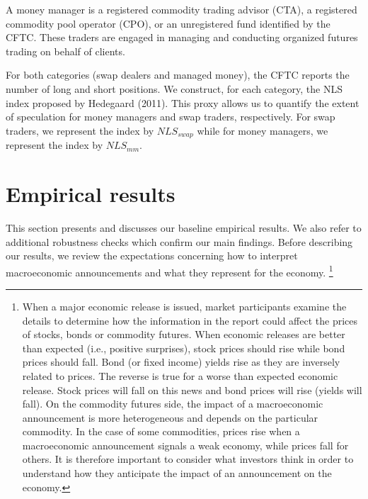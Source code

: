 \documentclass[12pt]{article}
\begin{document}
 A money manager is a registered commodity trading advisor (CTA), a registered commodity pool operator (CPO), or an unregistered fund identified by the CFTC. These traders are engaged in managing and conducting organized futures trading on behalf of clients. 

For both categories (swap dealers and managed money), the CFTC reports the number of long and short positions. We construct, for each category, the NLS index proposed by Hedegaard (2011). This proxy allows us to quantify the extent of speculation for money managers and swap traders, respectively. For swap traders, we represent the index by $NLS_{swap}$ while for money managers, we represent the index by $NLS_{mm}$.


\section{Empirical results} \label{sec:result}
This section presents and discusses our baseline empirical results. We also refer to additional robustness checks which confirm our main findings. Before describing our results, we review the expectations concerning how to interpret macroeconomic announcements and what they represent for the economy.
\footnote{When a major economic release is issued, market participants examine the details to determine how the information in the report could affect the prices of stocks, bonds or commodity futures. When economic releases are better than expected (i.e., positive surprises),  stock prices should rise while bond prices should fall. Bond (or fixed income) yields rise as they are inversely related to prices. The reverse is true for a worse than expected economic release. Stock prices will fall on this news and bond prices will rise (yields will fall). On the commodity futures side, the impact of a macroeconomic announcement is more heterogeneous and depends on the particular commodity. In the case of some commodities, prices rise when a macroeconomic announcement signals a weak economy, while prices fall for others. It is therefore important to consider what investors think in order to understand how they anticipate the impact of an announcement on the economy.}
 
\end{document}
